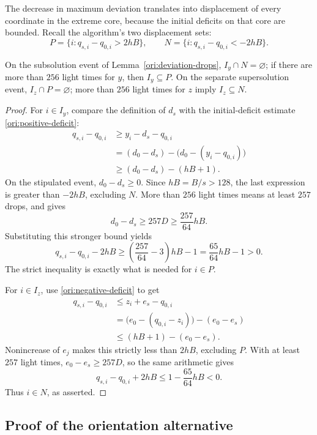 The decrease in maximum deviation translates into displacement of every
coordinate in the extreme core, because the initial deficits on that
core are bounded. Recall the algorithm's two displacement sets:
\[
  P=\{i:q_{s,i}-q_{0,i}>2hB\},
  \qquad
  N=\{i:q_{s,i}-q_{0,i}<-2hB\}.
\]

\begin{lemma}
\label{ori:core-displacement}
On the subsolution event of Lemma~\ref{ori:deviation-drops},
\(I_y\cap N=\varnothing\); if there are more than \(256\) light
times for \(y\), then \(I_y\subseteq P\).
On the separate supersolution event,
\(I_z\cap P=\varnothing\); more than \(256\) light times for \(z\)
imply \(I_z\subseteq N\).
\end{lemma}

\begin{proof}
For \(i\in I_y\), compare the definition of \(d_s\) with the
initial-deficit estimate \eqref{ori:positive-deficit}:
\begin{align*}
  q_{s,i}-q_{0,i}
  &\geq y_i-d_s-q_{0,i}\\
  &=(d_0-d_s)-\bigl(d_0-(y_i-q_{0,i})\bigr)\\
  &\geq(d_0-d_s)-(hB+1).
\end{align*}
On the stipulated event, \(d_0-d_s\geq0\). Since \(hB=B/s>128\),
the last expression is greater than \(-2hB\), excluding \(N\).
More than \(256\) light times means at least \(257\) drops, and gives
\[
  d_0-d_s\geq257D\geq\frac{257}{64}hB.
\]
Substituting this stronger bound yields
\[
  q_{s,i}-q_{0,i}-2hB
  \geq \left(\frac{257}{64}-3\right)hB-1
  =\frac{65}{64}hB-1
  >0.
\]
The strict inequality is exactly what is needed for \(i\in P\).

For \(i\in I_z\), use \eqref{ori:negative-deficit} to get
\begin{align*}
  q_{s,i}-q_{0,i}
  &\leq z_i+e_s-q_{0,i}\\
  &=\bigl(e_0-(q_{0,i}-z_i)\bigr)-(e_0-e_s)\\
  &\leq(hB+1)-(e_0-e_s).
\end{align*}
Nonincrease of \(e_j\) makes this strictly less than \(2hB\),
excluding \(P\). With at least \(257\) light times,
\(e_0-e_s\geq257D\), so the same arithmetic gives
\[
  q_{s,i}-q_{0,i}+2hB
  \leq 1-\frac{65}{64}hB<0.
\]
Thus \(i\in N\), as asserted.
\end{proof}

\subsection{Proof of the orientation alternative}

